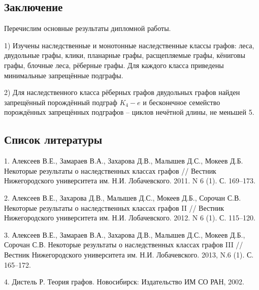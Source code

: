 \documentclass[12pt]{article}
\begin{document}
	\begin{center}
		\item
		\section*{Заключение}
	\end{center}

 Перечислим основные результаты дипломной работы.
 \par 1) Изучены наследственные и монотонные наследственные классы графов: леса, двудольные графы, клики, планарные графы, расщепляемые графы, кёниговы графы, блочные леса, рёберные графы. Для каждого класса приведены минимальные запрещённые подграфы.
 \par 2) Для наследственного класса рёберных графов двудольных графов найден запрещённый порождённый подграф $K_4 - e$ и бесконечное семейство порождённых запрещённых подграфов -- циклов нечётной длины, не меньшей 5.
  
 \newpage
  
\begin{center}
	\item
	\subsection*{Список литературы}
\end{center}

1. Алексеев В.Е., Замараев  В.А., Захарова Д.В., Малышев Д.С., Мокеев Д.Б. Некоторые результаты о наследственных классах графов // Вестник Нижегородского университета им. Н.И. Лобачевского. 2011. N 6 (1). С. 169–173.

2. Алексеев В.Е., Захарова Д.В., Малышев Д.С., Мокеев Д.Б., Сорочан С.В. Некоторые результаты о наследственных классах графов II // Вестник Нижегородского университета им. Н.И. Лобачевского. 2012. N 6 (1). С. 115–120.

3. Алексеев В.Е., Замараев  В.А., Захарова Д.В., Малышев Д.С., Мокеев Д.Б., Сорочан С.В. Некоторые результаты о наследственных классах графов III // Вестник Нижегородского университета им. Н.И. Лобачевского. 2013, N.6 (1). С. 165–172.

4. Дистель Р. Теория графов. Новосибирск: Издательство ИМ СО РАН, 2002.
\end{document}
